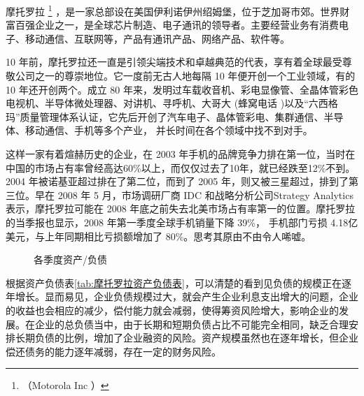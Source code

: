 \documentclass{ctexart}
\begin{document}
摩托罗拉 \footnote{（Motorola Inc ）} ，是一家总部设在美国伊利诺伊州绍姆堡，位于芝加哥市郊。世界财富百强企业之一，是全球芯片制造、电子通讯的领导者。主要经营业务有消费电子、移动通信、互联网等，产品有通讯产品、网络产品、软件等。

10 年前，摩托罗拉还一直是引领尖端技术和卓越典范的代表，享有着全球最受尊敬公司之一的尊崇地位。它一度前无古人地每隔 10 年便开创一个工业领域，有的 10 年还开创两个。成立 80 年来，发明过车载收音机、彩电显像管、全晶体管彩色电视机、半导体微处理器、对讲机、寻呼机、大哥大 (蜂窝电话 )以及\enquote{六西格玛}质量管理体系认证，它先后开创了汽车电子、晶体管彩电、集群通信、半导体、移动通信、手机等多个产业， 并长时间在各个领域中找不到对手。

这样一家有着煊赫历史的企业，在 2003 年手机的品牌竞争力排在第一位，当时在中国的市场占有率曾经高达60\%以上，而仅仅过去了10年，就已经跌至12\%不到。 2004 年被诺基亚超过排在了第二位，而到了 2005 年，则又被三星超过，排到了第三位。早在 2008 年 5 月，市场调研厂商 IDC 和战略分析公司Strategy Analytics 表示，摩托罗拉可能在 2008 年底之前失去北美市场占有率第一的位置。摩托罗拉的当季报也显示，2008 年第一季度全球手机销量下降 39\%， 手机部门亏损 4.18亿美元，与上年同期相比亏损额增加了 80\%。思考其原由不由令人唏嘘。\cite{吴定祥2015中国联想并购摩托罗拉案例分析}

\begin{figure}[htpb]
	\centering
	\caption{各季度资产/负债}
	\label{fig:各季度资产/负债}
\end{figure}

根据资产负债表\ref{tab:摩托罗拉资产负债表}，可以清楚的看到见负债的规模正在逐年增长。显而易见，企业负债规模过大，就会产生企业利息支出增大的问题，企业的收益也会相应的减少，偿付能力就会减弱，使得筹资风险增大，影响企业的发展。在企业的总负债当中，由于长期和短期负债占比不可能完全相同，缺乏合理安排长期负债的比例，增加了企业融资的风险。资产规模虽然也在逐年增长，但企业偿还债务的能力逐年减弱，存在一定的财务风险。
\end{document}

